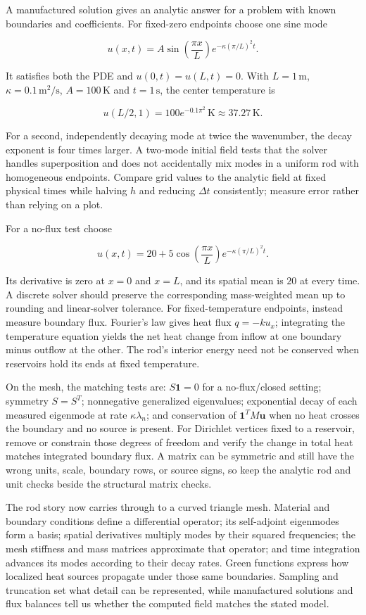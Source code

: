 A manufactured solution gives an analytic answer for a problem with known boundaries and coefficients. For fixed-zero endpoints choose one sine mode

\[
u(x,t)=A\sin\left(\frac{\pi x}{L}\right)e^{-\kappa(\pi/L)^2t}.
\]

It satisfies both the PDE and \(u(0,t)=u(L,t)=0\). With \(L=1\,\mathrm m\), \(\kappa=0.1\,\mathrm{m^2/s}\), \(A=100\,\mathrm K\) and \(t=1\,\mathrm s\), the center temperature is

\[
u(L/2,1)=100e^{-0.1\pi^2}\,\mathrm K\approx37.27\,\mathrm K.
\]

For a second, independently decaying mode at twice the wavenumber, the decay exponent is four times larger. A two-mode initial field tests that the solver handles superposition and does not accidentally mix modes in a uniform rod with homogeneous endpoints. Compare grid values to the analytic field at fixed physical times while halving \(h\) and reducing \(\Delta t\) consistently; measure error rather than relying on a plot.

For a no-flux test choose

\[
u(x,t)=20+5\cos\left(\frac{\pi x}{L}\right)e^{-\kappa(\pi/L)^2t}.
\]

Its derivative is zero at \(x=0\) and \(x=L\), and its spatial mean is \(20\) at every time. A discrete solver should preserve the corresponding mass-weighted mean up to rounding and linear-solver tolerance. For fixed-temperature endpoints, instead measure boundary flux. Fourier's law gives heat flux \(q=-k u_x\); integrating the temperature equation yields the net heat change from inflow at one boundary minus outflow at the other. The rod's interior energy need not be conserved when reservoirs hold its ends at fixed temperature.

On the mesh, the matching tests are: \(S\mathbf1=0\) for a no-flux/closed setting; symmetry \(S=S^T\); nonnegative generalized eigenvalues; exponential decay of each measured eigenmode at rate \(\kappa\lambda_n\); and conservation of \(\mathbf1^TM\mathbf u\) when no heat crosses the boundary and no source is present. For Dirichlet vertices fixed to a reservoir, remove or constrain those degrees of freedom and verify the change in total heat matches integrated boundary flux. A matrix can be symmetric and still have the wrong units, scale, boundary rows, or source signs, so keep the analytic rod and unit checks beside the structural matrix checks.

The rod story now carries through to a curved triangle mesh. Material and boundary conditions define a differential operator; its self-adjoint eigenmodes form a basis; spatial derivatives multiply modes by their squared frequencies; the mesh stiffness and mass matrices approximate that operator; and time integration advances its modes according to their decay rates. Green functions express how localized heat sources propagate under those same boundaries. Sampling and truncation set what detail can be represented, while manufactured solutions and flux balances tell us whether the computed field matches the stated model.

